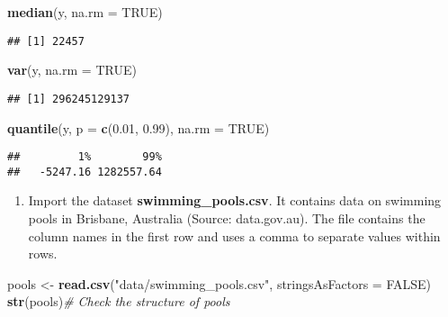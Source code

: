 \documentclass[]{article}
\newenvironment{Shaded}{\begin{snugshade}}{\end{snugshade}}
\newcommand{\KeywordTok}[1]{\textcolor[rgb]{0.13,0.29,0.53}{\textbf{#1}}}
\newcommand{\DataTypeTok}[1]{\textcolor[rgb]{0.13,0.29,0.53}{#1}}
\newcommand{\FloatTok}[1]{\textcolor[rgb]{0.00,0.00,0.81}{#1}}
\newcommand{\StringTok}[1]{\textcolor[rgb]{0.31,0.60,0.02}{#1}}
\newcommand{\CommentTok}[1]{\textcolor[rgb]{0.56,0.35,0.01}{\textit{#1}}}
\newcommand{\OtherTok}[1]{\textcolor[rgb]{0.56,0.35,0.01}{#1}}
\newcommand{\NormalTok}[1]{#1}
\providecommand{\tightlist}{%
  \setlength{\itemsep}{0pt}\setlength{\parskip}{0pt}}
\begin{document}
\begin{Shaded}
\begin{Highlighting}[]
\KeywordTok{median}\NormalTok{(y, }\DataTypeTok{na.rm =} \OtherTok{TRUE}\NormalTok{)}
\end{Highlighting}
\end{Shaded}

\begin{verbatim}
## [1] 22457
\end{verbatim}

\begin{Shaded}
\begin{Highlighting}[]
\KeywordTok{var}\NormalTok{(y, }\DataTypeTok{na.rm =} \OtherTok{TRUE}\NormalTok{)}
\end{Highlighting}
\end{Shaded}

\begin{verbatim}
## [1] 296245129137
\end{verbatim}

\begin{Shaded}
\begin{Highlighting}[]
\KeywordTok{quantile}\NormalTok{(y, }\DataTypeTok{p =} \KeywordTok{c}\NormalTok{(}\FloatTok{0.01}\NormalTok{, }\FloatTok{0.99}\NormalTok{), }\DataTypeTok{na.rm =} \OtherTok{TRUE}\NormalTok{)}
\end{Highlighting}
\end{Shaded}

\begin{verbatim}
##         1%        99% 
##   -5247.16 1282557.64
\end{verbatim}

\begin{enumerate}
\def\labelenumi{\arabic{enumi}.}
\setcounter{enumi}{7}
\tightlist
\item
  Import the dataset \textbf{swimming\_pools.csv}. It contains data on
  swimming pools in Brisbane, Australia (Source: data.gov.au). The file
  contains the column names in the first row and uses a comma to
  separate values within rows.
\end{enumerate}

\begin{Shaded}
\begin{Highlighting}[]
\NormalTok{pools <-}\StringTok{ }\KeywordTok{read.csv}\NormalTok{(}\StringTok{"data/swimming_pools.csv"}\NormalTok{, }\DataTypeTok{stringsAsFactors =} \OtherTok{FALSE}\NormalTok{)}
\KeywordTok{str}\NormalTok{(pools)}\CommentTok{# Check the structure of pools}
\end{Highlighting}
\end{Shaded}
\end{document}
